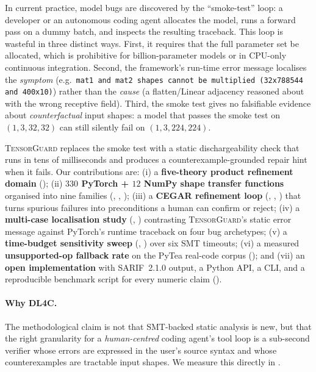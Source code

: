 \documentclass{article}
\theoremstyle{plain}
\theoremstyle{definition}
\newcommand{\TensorGuard}{\textsc{TensorGuard}}
\newcommand{\code}[1]{\texttt{\small #1}}
\begin{document}
In current practice, model bugs are discovered by the
``smoke-test'' loop: a developer or an autonomous coding agent
allocates the model, runs a forward pass on a dummy batch, and
inspects the resulting traceback.  This loop is wasteful in three
distinct ways.  First, it requires that the full parameter set be
allocated, which is prohibitive for billion-parameter models or in
CPU-only continuous integration.  Second, the framework's run-time
error message localises the \emph{symptom} (e.g.\ \code{mat1 and
mat2 shapes cannot be multiplied (32x788544 and 400x10)}) rather
than the \emph{cause} (a flatten/Linear adjacency reasoned about
with the wrong receptive field).  Third, the smoke test gives no
falsifiable evidence about \emph{counterfactual} input shapes: a
model that passes the smoke test on $(1,3,32,32)$ can still
silently fail on $(1,3,224,224)$.

\TensorGuard{} replaces the smoke test with a static dischargeability
check that runs in tens of milliseconds and produces a
counterexample-grounded repair hint when it fails.  Our contributions
are: (i) a \textbf{five-theory product refinement domain}
(); (ii) \textbf{$330$ PyTorch + $12$ NumPy shape
transfer functions} organised into nine families
(, ,
); (iii) a \textbf{CEGAR refinement loop}
(, , )
that turns spurious failures into preconditions a human can confirm
or reject; (iv) a \textbf{multi-case localisation study}
(, ) contrasting
\TensorGuard{}'s static error message against PyTorch's runtime
traceback on four bug archetypes; (v) a \textbf{time-budget
sensitivity sweep} (, )
over six SMT timeouts; (vi) a measured \textbf{unsupported-op
fallback rate} on the PyTea real-code corpus
(); and (vii) an \textbf{open implementation}
with SARIF~2.1.0 output, a Python API, a CLI, and a reproducible
benchmark script for every numeric claim
().

\paragraph{Why DL4C.} The methodological claim is not that
SMT-backed static analysis is new, but that the right granularity
for a \emph{human-centred} coding agent's tool loop is a
sub-second verifier whose errors are expressed in the user's
source syntax and whose counterexamples are tractable input
shapes.  We measure this directly in .
\end{document}
